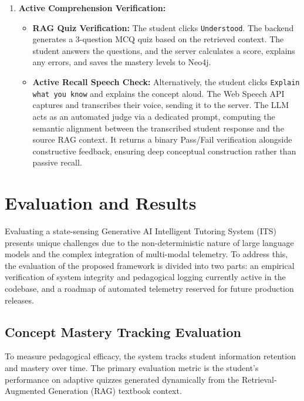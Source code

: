 \documentclass[final,5p,times,twocolumn,authoryear]{elsarticle}
\begin{document}
\begin{enumerate}
    \item \textbf{Active Comprehension Verification:}
    \begin{itemize}
        \item \textbf{RAG Quiz Verification:} The student clicks \texttt{Understood}. The backend generates a 3-question MCQ quiz based on the retrieved context. The student answers the questions, and the server calculates a score, explains any errors, and saves the mastery levels to Neo4j.
        \item \textbf{Active Recall Speech Check:} Alternatively, the student clicks \texttt{Explain what you know} and explains the concept aloud. The Web Speech API captures and transcribes their voice, sending it to the server. The LLM acts as an automated judge via a dedicated prompt, computing the semantic alignment between the transcribed student response and the source RAG context. It returns a binary Pass/Fail verification alongside constructive feedback, ensuring deep conceptual construction rather than passive recall.
    \end{itemize}
\end{enumerate}

\section{Evaluation and Results}
\label{sec:evaluation}

Evaluating a state-sensing Generative AI Intelligent Tutoring System (ITS) presents unique challenges due to the non-deterministic nature of large language models and the complex integration of multi-modal telemetry. To address this, the evaluation of the proposed framework is divided into two parts: an empirical verification of system integrity and pedagogical logging currently active in the codebase, and a roadmap of automated telemetry reserved for future production releases.

\subsection{Concept Mastery Tracking Evaluation}
\label{subsec:eval_mastery}

To measure pedagogical efficacy, the system tracks student information retention and mastery over time. The primary evaluation metric is the student's performance on adaptive quizzes generated dynamically from the Retrieval-Augmented Generation (RAG) textbook context. 
\end{document}
